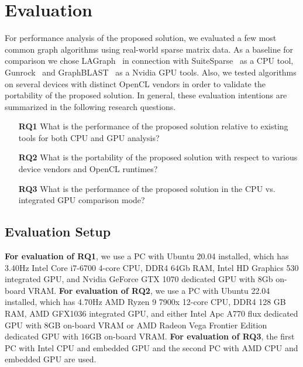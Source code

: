 \section{Evaluation}

For performance analysis of the proposed solution, we evaluated a few most common graph algorithms using real-world sparse matrix data. 
As a baseline for comparison we chose LAGraph~\cite{szarnyas2021lagraph} in connection with SuiteSparse~\cite{10.1145/3322125} as a CPU tool, Gunrock~\cite{7967137} and GraphBLAST~\cite{yang2019graphblast} as a Nvidia GPU tools. 
Also, we tested algorithms on several devices with distinct OpenCL vendors in order to validate the portability of the proposed solution. 
In general, these evaluation intentions are summarized in the following research questions. 

\vspace{0.2cm}
\begin{itemize}
    \item[\textbf{RQ1}] What is the performance of the proposed solution relative to existing tools for both CPU and GPU analysis?
    
    \item[\textbf{RQ2}] What is the portability of the proposed solution with respect to various device vendors and OpenCL runtimes?

    \item[\textbf{RQ3}] What is the performance of the proposed solution in the CPU vs. integrated GPU comparison mode?
\end{itemize}

\subsection{Evaluation Setup}

\textbf{For evaluation of RQ1}, we use a PC with Ubuntu 20.04 installed, which has 3.40Hz Intel Core i7-6700 4-core CPU, DDR4 64Gb RAM, Intel HD Graphics 530 integrated GPU, and Nvidia GeForce GTX 1070 dedicated GPU with 8Gb on-board VRAM. 
\textbf{For evaluation of RQ2}, we use a PC with Ubuntu 22.04 installed, which has 4.70Hz AMD Ryzen 9 7900x 12-core CPU, DDR4 128 GB RAM, AMD GFX1036 integrated GPU, and either Intel Apc A770 flux dedicated GPU with 8GB on-board VRAM or AMD Radeon Vega Frontier Edition dedicated GPU with 16GB on-board VRAM.
\textbf{For evaluation of RQ3}, the first PC with Intel CPU and embedded GPU and the second PC with AMD CPU and embedded GPU are used.

